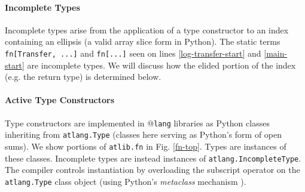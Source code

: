 \documentclass[9pt,preprint]{sigplanconf}
\newcommand{\lstinlinep}[1]{\lstinline[language=Python,basicstyle=\ttfamily\small]{#1}}
\begin{document}
\paragraph{Incomplete Types} Incomplete types arise from the application of a type constructor to an index containing an ellipsis (a valid array slice form in Python). The static terms \lstinlinep{fn[Transfer, ...]} and \lstinlinep{fn[...]} seen on lines \ref{log-transfer-start} and \ref{main-start} are incomplete types. We will discuss how the elided portion of the index (e.g. the return type) is determined below.

\paragraph{Active Type Constructors} Type constructors are implemented in @\texttt{lang} libraries as Python classes inheriting from \lstinlinep{atlang.Type} (classes here serving as Python's form of open sums). We show portions of \lstinlinep{atlib.fn} in Fig. \ref{fn-top}. Types are instances of these classes. Incomplete types are instead instances of \lstinlinep{atlang.IncompleteType}. The compiler controls instantiation by overloading the subscript operator on the \lstinlinep{atlang.Type} class object (using Python's \emph{metaclass} mechanism \cite{python}).
\end{document}
